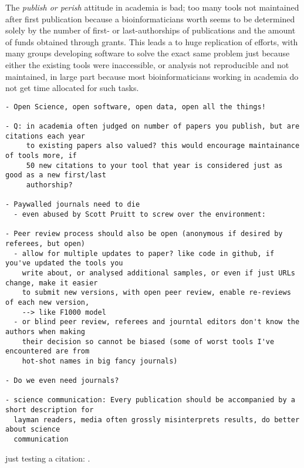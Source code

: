 The \textit{publish or perish} attitude in academia is bad; too many tools not maintained after first publication because a bioinformaticians worth seems to be determined solely by the number of first- or last-authorships of publications and the amount of funds obtained through grants. This leads a to huge replication of efforts, with many groups developing software to solve the exact same problem just because either the existing tools were inaccessible, or analysis not reproducible and not maintained, in large part because most bioinformaticians working in academia do not get time allocated for such tasks.

\begin{verbatim}
- Open Science, open software, open data, open all the things!

- Q: in academia often judged on number of papers you publish, but are citations each year
     to existing papers also valued? this would encourage maintainance of tools more, if
     50 new citations to your tool that year is considered just as good as a new first/last
     authorship?

- Paywalled journals need to die
  - even abused by Scott Pruitt to screw over the environment:

- Peer review process should also be open (anonymous if desired by referees, but open)
  - allow for multiple updates to paper? like code in github, if you've updated the tools you
    write about, or analysed additional samples, or even if just URLs change, make it easier
    to submit new versions, with open peer review, enable re-reviews of each new version,
    --> like F1000 model
  - or blind peer review, referees and journtal editors don't know the authors when making
    their decision so cannot be biased (some of worst tools I've encountered are from
    hot-shot names in big fancy journals)

- Do we even need journals?

- science communication: Every publication should be accompanied by a short description for
  layman readers, media often grossly misinterprets results, do better about science
  communication
\end{verbatim}

just testing a citation: \cite{hiltemann2014ireport}.



